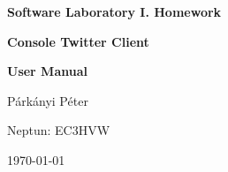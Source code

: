 \begin{titlepage}
 
\begin{center}
\vspace{20cm}

{\huge \bfseries Software Laboratory I. Homework}

{\large \bfseries Console Twitter Client}

{\bfseries User Manual }
\vspace{0.4cm}
 
\vfill
 
{\Large Párkányi Péter}

{Neptun: EC3HVW}

{\today}
\end{center}
 
\end{titlepage}

